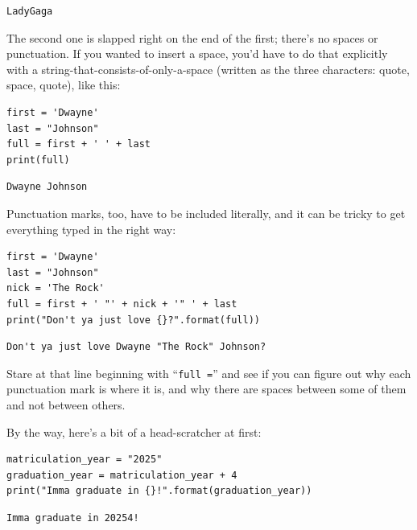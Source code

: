 \begin{Verbatim}[fontsize=\small,samepage=true,frame=leftline,framesep=5mm,framerule=1mm]
LadyGaga
\end{Verbatim}

The second one is slapped right on the end of the first; there's no spaces or
punctuation. If you wanted to insert a space, you'd have to do that explicitly
with a string-that-consists-of-only-a-space (written as the three characters:
quote, space, quote), like this:

\begin{Verbatim}[fontsize=\small,samepage=true,frame=single,framesep=3mm]
first = 'Dwayne'
last = "Johnson"
full = first + ' ' + last
print(full)
\end{Verbatim}

\begin{Verbatim}[fontsize=\small,samepage=true,frame=leftline,framesep=5mm,framerule=1mm]
Dwayne Johnson
\end{Verbatim}

Punctuation marks, too, have to be included literally, and it can be tricky to
get everything typed in the right way:

\begin{Verbatim}[fontsize=\small,samepage=true,frame=single,framesep=3mm]
first = 'Dwayne'
last = "Johnson"
nick = 'The Rock'
full = first + ' "' + nick + '" ' + last
print("Don't ya just love {}?".format(full))
\end{Verbatim}

\begin{Verbatim}[fontsize=\small,samepage=true,frame=leftline,framesep=5mm,framerule=1mm]
Don't ya just love Dwayne "The Rock" Johnson?
\end{Verbatim}

Stare at that line beginning with ``\texttt{full =}'' and see if you can figure
out why each punctuation mark is where it is, and why there are spaces between
some of them and not between others.

By the way, here's a bit of a head-scratcher at first:

\begin{Verbatim}[fontsize=\small,samepage=true,frame=single,framesep=3mm]
matriculation_year = "2025"
graduation_year = matriculation_year + 4
print("Imma graduate in {}!".format(graduation_year))
\end{Verbatim}

\begin{Verbatim}[fontsize=\small,samepage=true,frame=leftline,framesep=5mm,framerule=1mm]
Imma graduate in 20254!
\end{Verbatim}


